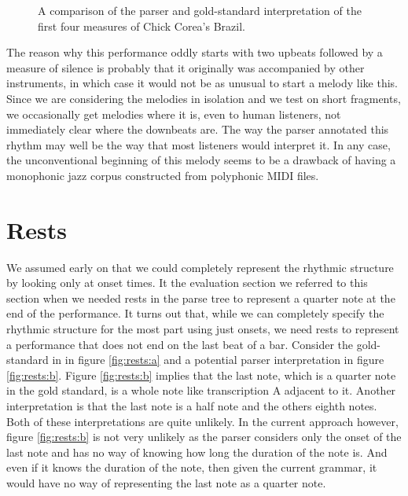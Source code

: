 \begin{figure}
\centering
{}

\caption{A comparison of the parser and gold-standard interpretation of the first four measures of Chick Corea's Brazil.}
\label{fig:brazil}
\end{figure}

The reason why this performance oddly starts with two upbeats followed by a measure of silence is probably that it originally was accompanied by other instruments, in which case it would not be as unusual to start a melody like this. Since we are considering the melodies in isolation and we test on short fragments, we occasionally get melodies where it is, even to human listeners, not immediately clear where the downbeats are. The way the parser annotated this rhythm may well be the way that most listeners would interpret it. In any case, the unconventional beginning of this melody seems to be a drawback of having a monophonic jazz corpus constructed from polyphonic MIDI files.

\section{Rests}

We assumed early on that we could completely represent the rhythmic structure by looking only at onset times. It the evaluation section we referred to this section when we needed rests in the parse tree to represent a quarter note at the end of the performance. It turns out that, while we can completely specify the rhythmic structure for the most part using just onsets, we need rests to represent a performance that does not end on the last beat of a bar. Consider the gold-standard in in figure \ref{fig:rests:a} and a potential parser interpretation in figure \ref{fig:rests:b}. Figure \ref{fig:rests:b} implies that the last note, which is a quarter note in the gold standard, is a whole note like transcription A adjacent to it. Another interpretation is that the last note is a half note and the others eighth notes. Both of these interpretations are quite unlikely. In the current approach however, figure \ref{fig:rests:b} is not very unlikely as the parser considers only the onset of the last note and has no way of knowing how long the duration of the note is. And even if it knows the duration of the note, then given the current grammar, it would have no way of representing the last note as a quarter note. 

